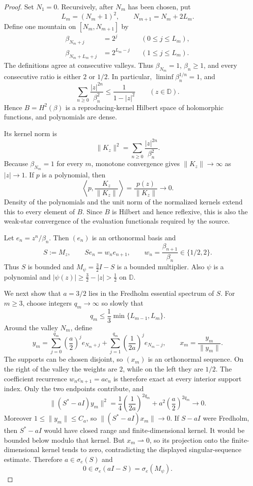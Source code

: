 \documentclass[11pt]{article}
\newcommand{\D}{\mathbb D}
\begin{document}
\begin{proof}
Set $N_1=0$.  Recursively, after $N_m$ has been chosen, put
\[
 L_m=(N_m+1)^2,
 \qquad N_{m+1}=N_m+2L_m.
\]
Define one mountain on $[N_m,N_{m+1}]$ by
\begin{align*}
 \beta_{N_m+j}&=2^j &&(0\leq j\leq L_m),\\
 \beta_{N_m+L_m+j}&=2^{L_m-j} &&(1\leq j\leq L_m).
\end{align*}
The definitions agree at consecutive valleys.  Thus $\beta_{N_m}=1$,
$\beta_n\geq1$, and every consecutive ratio is either $2$ or $1/2$.
In particular, $\liminf\beta_n^{1/n}=1$, and
\[
 \sum_{n\geq0}\frac{|z|^{2n}}{\beta_n^2}
 \leq\frac1{1-|z|^2}\qquad(z\in\D).
\]
Hence $B=H^2(\beta)$ is a reproducing-kernel Hilbert space of holomorphic
functions, and polynomials are dense.

Its kernel norm is
\[
 \|K_z\|^2=\sum_{n\geq0}\frac{|z|^{2n}}{\beta_n^2}.
\]
Because $\beta_{N_m}=1$ for every $m$, monotone convergence gives
$\|K_z\|\to\infty$ as $|z|\to1$.  If $p$ is a polynomial, then
\[
 \left\langle p,\frac{K_z}{\|K_z\|}\right\rangle
 =\frac{p(z)}{\|K_z\|}\longrightarrow0.
\]
Density of the polynomials and the unit norm of the normalized kernels extend
this to every element of $B$.  Since $B$ is Hilbert and hence reflexive, this
is also the weak-star convergence of the evaluation functionals required by
the source.

Let $e_n=z^n/\beta_n$.  Then $(e_n)$ is an orthonormal basis and
\[
 S:=M_z,\qquad Se_n=w_ne_{n+1},\qquad
 w_n=\frac{\beta_{n+1}}{\beta_n}\in\{1/2,2\}.
\]
Thus $S$ is bounded and $M_\psi=\frac32 I-S$ is a bounded multiplier.
Also $\psi$ is a polynomial and
$|\psi(z)|\geq\frac32-|z|>\frac12$ on $\D$.

We next show that $a=3/2$ lies in the Fredholm essential spectrum of $S$.
For $m\geq3$, choose integers $q_m\to\infty$ so slowly that
\[
 q_m\leq\frac13\min\{L_{m-1},L_m\}.
\]
Around the valley $N_m$, define
\[
 y_m=
 \sum_{j=0}^{q_m}\left(\frac a2\right)^j e_{N_m+j}
 +\sum_{j=1}^{q_m}\left(\frac1{2a}\right)^j e_{N_m-j},
 \qquad x_m=\frac{y_m}{\|y_m\|}.
\]
The supports can be chosen disjoint, so $(x_m)$ is an orthonormal sequence.
On the right of the valley the weights are $2$, while on the left they are
$1/2$.  The coefficient recurrence $w_nc_{n+1}=ac_n$ is therefore exact at
every interior support index.  Only the two endpoints contribute, and
\[
 \|(S^*-aI)y_m\|^2
 =\frac14\left(\frac1{2a}\right)^{2q_m}
  +a^2\left(\frac a2\right)^{2q_m}\longrightarrow0.
\]
Moreover $1\leq\|y_m\|\leq C_a$, so
$\|(S^*-aI)x_m\|\to0$.  If $S-aI$ were Fredholm, then $S^*-aI$ would have
closed range and finite-dimensional kernel.  It would be bounded below
modulo that kernel.  But $x_m\rightharpoonup0$, so its projection onto the
finite-dimensional kernel tends to zero, contradicting the displayed
singular-sequence estimate.  Therefore $a\in\sigma_e(S)$ and
\[
 0\in\sigma_e(aI-S)=\sigma_e(M_\psi).
\]


\end{proof}
\end{document}
